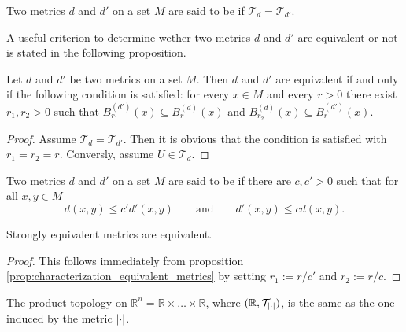\begin{definition}
	Two metrics $d$ and $d'$ on a set $M$ are said to be  if $\mathcal{T}_d = \mathcal{T}_{d'}$.
\end{definition}

A useful criterion to determine wether two metrics $d$ and $d'$ are equivalent or not is stated in the following proposition.

\begin{proposition}
	Let $d$ and $d'$ be two metrics on a set $M$. Then $d$ and $d'$ are equivalent if and only if the following condition is satisfied: for every $x \in M$ and every $r > 0$ there exist $r_1,r_2 > 0$ such that $B_{r_1}^{(d')}(x) \subseteq B_r^{(d)}(x)$ and $B_{r_2}^{(d)}(x) \subseteq B_r^{(d')}(x)$. 
	\label{prop:characterization_equivalent_metrics}
\end{proposition}

\begin{proof}
	Assume $\mathcal{T}_d = \mathcal{T}_{d'}$. Then it is obvious that the condition is satisfied with $r_1 = r_2 = r$. Conversly, assume $U \in \mathcal{T}_d$.	
\end{proof}

\begin{definition}
	Two metrics $d$ and $d'$ on a set $M$ are said to be  if there are $c, c' > 0$ such that for all $x,y \in M$ 
	\begin{equation}
		d(x,y) \leq c' d'(x,y) \qquad \text{and} \qquad d'(x,y) \leq c d(x,y).
	\end{equation}
\end{definition}

\begin{corollary}
	Strongly equivalent metrics are equivalent.
\end{corollary}

\begin{proof}
	This follows immediately from proposition \ref{prop:characterization_equivalent_metrics} by setting $r_1 := r/c'$ and $r_2 := r/c$.
\end{proof}

\begin{proposition}
	The product topology on $\mathbb{R}^n = \mathbb{R} \times \dots \times \mathbb{R}$, where $(\mathbb{R},\mathcal{T}_{\abs[0]{\cdot}})$, is the same as the one induced by the metric $\abs[0]{\cdot}$.
	\label{prop:product_topology_Rn}
\end{proposition}

